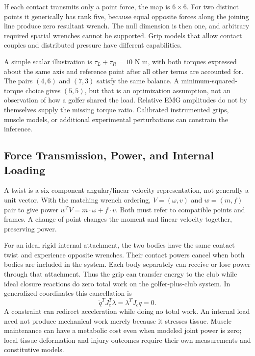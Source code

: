 If each contact transmits only a point force, the map is $6\times6$. For two
distinct points it generically has rank five, because equal opposite forces along
the joining line produce zero resultant wrench. The null dimension is then one,
and arbitrary required spatial wrenches cannot be supported. Grip models that
allow contact couples and distributed pressure have different capabilities.

A simple scalar illustration is $\tau_L+\tau_R=10$ N m, with both torques expressed
about the same axis and reference point after all other terms are accounted for.
The pairs $(4,6)$ and $(7,3)$ satisfy the same balance. A minimum-squared-torque
choice gives $(5,5)$, but that is an optimization assumption, not an observation
of how a golfer shared the load. Relative EMG amplitudes do not by themselves
supply the missing torque ratio. Calibrated instrumented grips, muscle models,
or additional experimental perturbations can constrain the inference.

\subsection{Force Transmission, Power, and Internal Loading}

A twist is a six-component angular/linear velocity representation, not generally
a unit vector. With the matching wrench ordering, $V=(\omega,v)$ and
$w=(m,f)$ pair to give power $w^TV=m\cdot\omega+f\cdot v$. Both must refer to
compatible points and frames. A change of point changes the moment and linear
velocity together, preserving power.

For an ideal rigid internal attachment, the two bodies have the same contact
twist and experience opposite wrenches. Their contact powers cancel when both
bodies are included in the system. Each body separately can receive or lose
power through that attachment. Thus the grip can transfer energy to the club
while ideal closure reactions do zero total work on the golfer-plus-club system.
In generalized coordinates this cancellation is
\begin{equation}
 \dot q^TJ_c^T\lambda=\lambda^TJ_c\dot q=0.
 \label{eq:orthogonality_relation}
\end{equation}
A constraint can redirect acceleration while doing no total work. An internal
load need not produce mechanical work merely because it stresses tissue. Muscle
maintenance can have a metabolic cost even when modeled joint power is zero;
local tissue deformation and injury outcomes require their own measurements and
constitutive models.

